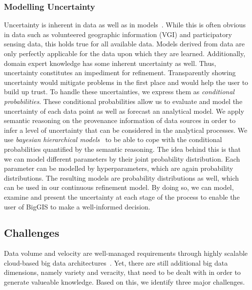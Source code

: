 \documentclass{sig-alternate-05-2015}
\begin{document}
\subsubsection{Modelling Uncertainty}
Uncertainty is inherent in data as well as in
models~\cite{cressie2015statistics}. While this is often obvious in data such
as volunteered geographic information (VGI) and participatory sensing data,
this holds true for all available data. Models derived from data
are only perfectly applicable for the data upon which they are learned.
Additionally, domain expert knowledge has some inherent uncertainty as well.
Thus, uncertainty constitutes an impediment for refinement. Transparently
showing uncertainty would mitigate problems in the first place and would help
the user to build up trust. To handle these uncertainties, we express them as
\textit{conditional probabilities}. These conditional probabilities allow us to
evaluate and model the uncertainty of each data point as well as forecast an
analytical model. We apply semantic reasoning on the provenance information of
data sources in order to infer a level of uncertainty that can be considered in
the analytical processes. We use \textit{bayesian hierarchical
models}~\cite{cressie2015statistics} to be able to cope with the conditional
probabilities quantified by the semantic reasoning. The idea behind this is
that we can model different parameters by their joint probability distribution.
Each parameter can be modelled by hyperparameters, which are again probability
distributions. The resulting models are probability distributions as well,
which can be used in our continuous refinement model. By doing so, we can
model, examine and present the uncertainty at each stage of the process to
enable the user of BigGIS to make a well-informed decision.

\subsection{Challenges}
\label{sec:chls}
Data volume and velocity are well-managed requirements through highly
scalable cloud-based big data architectures~\cite{Marz2013, Kreps2014}.
Yet, there are still additional big data dimensions, namely variety and
veracity, that need to be dealt with in order to generate valueable knowledge.
Based on this, we identify three major challenges.
\end{document}
